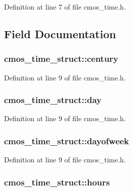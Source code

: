 Definition at line 7 of file cmos\_\-time.h.



\subsection{Field Documentation}
\hypertarget{structcmos__time__struct_af4f9659f76e167299202291c7699d19d}{
\subsubsection[{century}]{ {\bf cmos\_\-time\_\-struct::century}}}
\label{structcmos__time__struct_af4f9659f76e167299202291c7699d19d}


Definition at line 9 of file cmos\_\-time.h.

\hypertarget{structcmos__time__struct_a8c8f524958dd79404e7d04136a8a1149}{
\subsubsection[{day}]{ {\bf cmos\_\-time\_\-struct::day}}}
\label{structcmos__time__struct_a8c8f524958dd79404e7d04136a8a1149}


Definition at line 9 of file cmos\_\-time.h.

\hypertarget{structcmos__time__struct_aeecf979ae00d03b270c599663ce9dac9}{
\subsubsection[{dayofweek}]{ {\bf cmos\_\-time\_\-struct::dayofweek}}}
\label{structcmos__time__struct_aeecf979ae00d03b270c599663ce9dac9}


Definition at line 9 of file cmos\_\-time.h.

\hypertarget{structcmos__time__struct_a014f38ed5aaa7742dd95cab40cff2df0}{
\subsubsection[{hours}]{ {\bf cmos\_\-time\_\-struct::hours}}}
\label{structcmos__time__struct_a014f38ed5aaa7742dd95cab40cff2df0}


